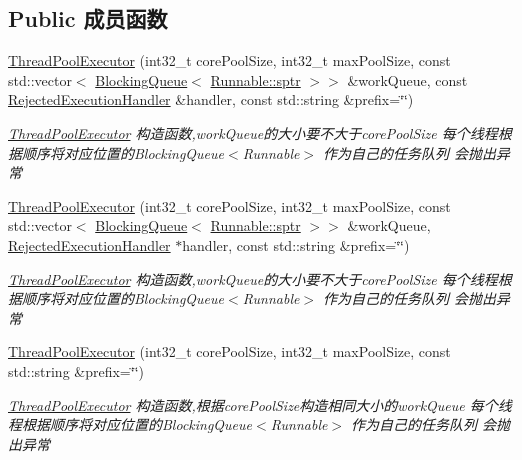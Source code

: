\subsection*{Public 成员函数}
\begin{DoxyCompactItemize}
\item 
\hyperlink{classThreadPoolExecutor_a212b34b7e25e9eba4e096473a1b81f9e}{Thread\+Pool\+Executor} (int32\+\_\+t core\+Pool\+Size, int32\+\_\+t max\+Pool\+Size, const std\+::vector$<$ \hyperlink{classBlockingQueue}{Blocking\+Queue}$<$ \hyperlink{classRunnable_abe8d3066c7305401d6f0aad8e70780f2}{Runnable\+::sptr} $>$$>$ \&work\+Queue, const \hyperlink{classRejectedExecutionHandler}{Rejected\+Execution\+Handler} \&handler, const std\+::string \&prefix=\char`\"{}\char`\"{})
\begin{DoxyCompactList}\small\item\em \hyperlink{classThreadPoolExecutor}{Thread\+Pool\+Executor} 构造函数,work\+Queue的大小要不大于core\+Pool\+Size 每个线程根据顺序将对应位置的\+Blocking\+Queue$<$\+Runnable$>$ 作为自己的任务队列 会抛出异常 \end{DoxyCompactList}\item 
\hyperlink{classThreadPoolExecutor_ab750236e7b95489a1cb66d4b026717fc}{Thread\+Pool\+Executor} (int32\+\_\+t core\+Pool\+Size, int32\+\_\+t max\+Pool\+Size, const std\+::vector$<$ \hyperlink{classBlockingQueue}{Blocking\+Queue}$<$ \hyperlink{classRunnable_abe8d3066c7305401d6f0aad8e70780f2}{Runnable\+::sptr} $>$$>$ \&work\+Queue, \hyperlink{classRejectedExecutionHandler}{Rejected\+Execution\+Handler} $\ast$handler, const std\+::string \&prefix=\char`\"{}\char`\"{})
\begin{DoxyCompactList}\small\item\em \hyperlink{classThreadPoolExecutor}{Thread\+Pool\+Executor} 构造函数,work\+Queue的大小要不大于core\+Pool\+Size 每个线程根据顺序将对应位置的\+Blocking\+Queue$<$\+Runnable$>$ 作为自己的任务队列 会抛出异常 \end{DoxyCompactList}\item 
\hyperlink{classThreadPoolExecutor_a071bcc9eb42b365e2ce28a32938d422e}{Thread\+Pool\+Executor} (int32\+\_\+t core\+Pool\+Size, int32\+\_\+t max\+Pool\+Size, const std\+::string \&prefix=\char`\"{}\char`\"{})
\begin{DoxyCompactList}\small\item\em \hyperlink{classThreadPoolExecutor}{Thread\+Pool\+Executor} 构造函数,根据core\+Pool\+Size构造相同大小的work\+Queue 每个线程根据顺序将对应位置的\+Blocking\+Queue$<$\+Runnable$>$ 作为自己的任务队列 会抛出异常 \end{DoxyCompactList}\item 

\end{DoxyCompactItemize}
